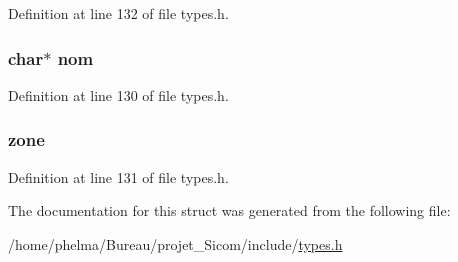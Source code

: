 Definition at line 132 of file types.\-h.

\hypertarget{struct__symb___abe308d273ff51ad86ff02ef3ba3b6f0e}{
\subsubsection[{nom}]{\setlength{\rightskip}{0pt plus 5cm}char$\ast$ nom}}\label{struct__symb___abe308d273ff51ad86ff02ef3ba3b6f0e}


Definition at line 130 of file types.\-h.

\hypertarget{struct__symb___a6a70ab3aecc26de50260bd4e04c43c9b}{
\subsubsection[{zone}]{ zone}}\label{struct__symb___a6a70ab3aecc26de50260bd4e04c43c9b}


Definition at line 131 of file types.\-h.



The documentation for this struct was generated from the following file\-:\begin{DoxyCompactItemize}
\item 
/home/phelma/\-Bureau/projet\-\_\-\-Sicom/include/\hyperlink{types_8h}{types.\-h}\end{DoxyCompactItemize}
